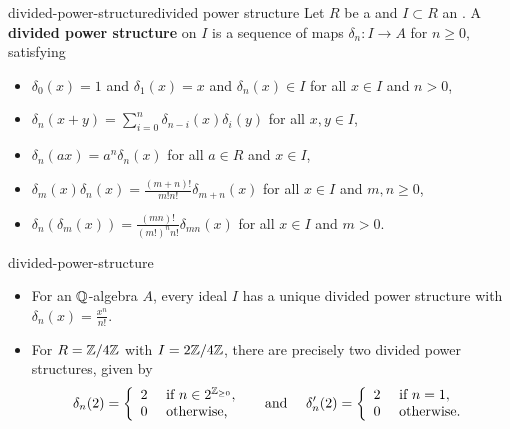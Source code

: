 \begin{topic}{divided-power-structure}{divided power structure}
    Let $R$ be a  and $I \subset R$ an . A \textbf{divided power structure} on $I$ is a sequence of maps $\delta_n : I \to A$ for $n \ge 0$, satisfying
    \begin{itemize}
        \item $\delta_0(x) = 1$ and $\delta_1(x) = x$ and $\delta_n(x) \in I$ for all $x \in I$ and $n > 0$,
        \item $\delta_n(x + y) = \sum_{i = 0}^{n} \delta_{n - i}(x) \delta_i(y)$ for all $x, y \in I$,
        \item $\delta_n(a x) = a^n \delta_n(x)$ for all $a \in R$ and $x \in I$,
        \item $\delta_m(x) \delta_n(x) = \frac{(m + n)!}{m! n!} \delta_{m + n}(x)$ for all $x \in I$ and $m, n \ge 0$,
        \item $\delta_n(\delta_m(x)) = \frac{(mn)!}{(m!)^n n!} \delta_{mn}(x)$ for all $x \in I$ and $m > 0$.
    \end{itemize}
\end{topic}

\begin{example}{divided-power-structure}
    \begin{itemize}
        \item For an $\mathbb{Q}$-algebra $A$, every ideal $I$ has a unique divided power structure with $\delta_n(x) = \frac{x^n}{n!}$.
        \item For $R = \mathbb{Z}/4\mathbb{Z}$ with $I = 2\mathbb{Z}/4\mathbb{Z}$, there are precisely two divided power structures, given by
        \[ \delta_n(2) = \left\{ \begin{array}{cl} 2 & \textup{ if } n \in 2^{\mathbb{Z}_{\ge 0}} , \\ 0 & \textup{ otherwise,} \end{array} \right. \quad \textup{ and } \quad \delta'_n(2) = \left\{ \begin{array}{cl} 2 & \textup{ if } n = 1 , \\ 0 & \textup{ otherwise.} \end{array} \right. \]
    \end{itemize}
\end{example}

